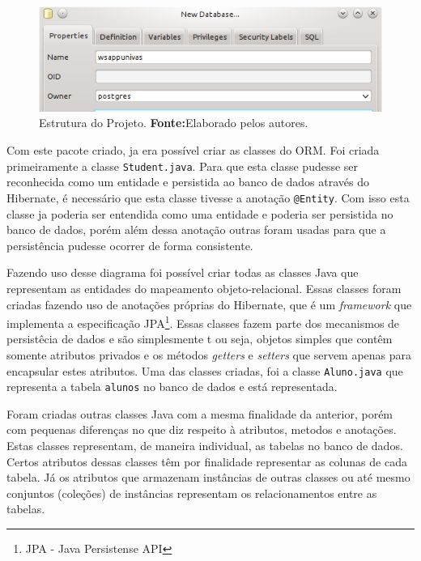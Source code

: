 \begin{figure}[h!]
	\centerline{\includegraphics[scale=0.8]{./imagens/2_q_metodologico/4_procedimentos_resultados/43_webservice/432_desenvolvimento/desws2.png}}
	\caption[Estrutura do Projeto]{Estrutura do Projeto.
		\textbf{Fonte:}Elaborado pelos autores.}
	\label{fig:desws1}
\end{figure}
		
	\par Com este pacote criado, ja era possível criar as classes do ORM. Foi
criada primeiramente a classe \texttt{Student.java}. Para que esta classe
pudesse ser reconhecida como um entidade e persistida ao banco de dados através
do Hibernate, é necessário que esta classe tivesse a anotação
\texttt{@Entity}. Com isso esta classe ja poderia ser entendida como uma
entidade e poderia ser persistida no banco de dados, porém além dessa anotação
outras foram usadas para que a persistência pudesse ocorrer de forma
consistente.





	
	
			
	
		\par Fazendo uso desse diagrama foi possível criar todas as classes 
	Java que representam as entidades do mapeamento objeto-relacional. 
	Essas classes foram criadas fazendo uso de anotações próprias do
	Hibernate, que é um \textit{framework} que implementa a especificação
	JPA\footnote{JPA - Java Persistense API}. Essas classes fazem parte
	dos mecanismos de persistêcia de dados e são simplesmente t ou seja, objetos
	simples que contêm somente atributos privados e os métodos \textit{getters} e
	\textit{setters} que servem apenas para encapsular estes atributos. Uma das
	classes criadas, foi a classe \texttt{Aluno.java} que representa a tabela
	\texttt{alunos} no banco de dados e está representada.
		
		\par Foram criadas outras classes Java com a mesma finalidade da
	anterior, porém com pequenas diferenças no que diz respeito à atributos,
	metodos e anotações. Estas classes representam, de maneira individual, as
	tabelas no banco de dados. Certos atributos dessas classes têm por finalidade
	representar as colunas de cada tabela. Já os atributos que armazenam instâncias
	de outras classes ou até mesmo conjuntos (coleções) de instâncias representam os
	relacionamentos entre as tabelas. 
	
